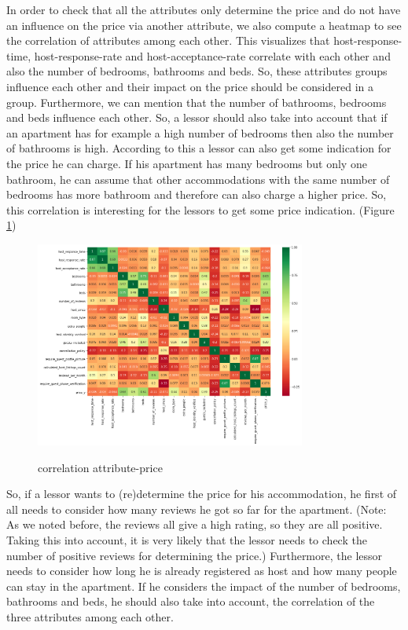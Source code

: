 In order to check that all the attributes only determine the price and do not have an influence on the price via another attribute, we also compute a heatmap to see the correlation of attributes among each other. This visualizes that host-response-time, host-response-rate and host-acceptance-rate correlate with each other and also the number of bedrooms, bathrooms and beds. So, these attributes groups influence each other and their impact on the price should be considered in a group. Furthermore, we can mention that the number of bathrooms, bedrooms and beds influence each other. So, a lessor should also take into account that if an apartment has for example a high number of bedrooms then also the number of bathrooms is high. According to this a lessor can also get some indication for the price he can charge. If his apartment has many bedrooms but only one bathroom, he can assume that other accommodations with the same number of bedrooms has more bathroom and therefore can also charge a higher price. So, this correlation is interesting for the lessors to get some price indication. (Figure \ref{heatmap })
\begin{figure}
  \begin{center}
  \includegraphics[width=3.5in]{photo/8_heatmap.png}\\
  \caption{correlation attribute-price}\label{heatmap }
  \end{center}
\end{figure}
So, if a lessor wants to (re)determine the price for his accommodation, he first of all needs to consider how many reviews he got so far for the apartment. (Note: As we noted before, the reviews all give a high rating, so they are all positive. Taking this into account, it is very likely that the lessor needs to check the number of positive reviews for determining the price.) Furthermore, the lessor needs to consider how long he is already registered as host and how many people can stay in the apartment. If he considers the impact of the number of bedrooms, bathrooms and beds, he should also take into account, the correlation of the three attributes among each other.
